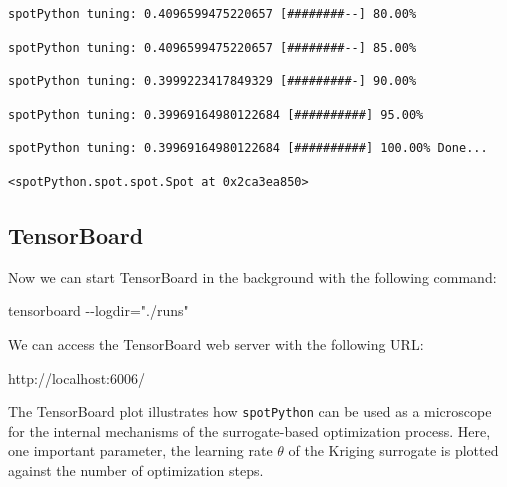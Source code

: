 \documentclass[
  letterpaper,
  DIV=11,
  numbers=noendperiod]{scrreprt}
\newenvironment{Shaded}{\begin{snugshade}}{\end{snugshade}}
\newcommand{\NormalTok}[1]{\textcolor[rgb]{0.00,0.23,0.31}{#1}}
\begin{document}
\begin{verbatim}
spotPython tuning: 0.4096599475220657 [########--] 80.00% 
\end{verbatim}

\begin{verbatim}
spotPython tuning: 0.4096599475220657 [########--] 85.00% 
\end{verbatim}

\begin{verbatim}
spotPython tuning: 0.3999223417849329 [#########-] 90.00% 
\end{verbatim}

\begin{verbatim}
spotPython tuning: 0.39969164980122684 [##########] 95.00% 
\end{verbatim}

\begin{verbatim}
spotPython tuning: 0.39969164980122684 [##########] 100.00% Done...
\end{verbatim}

\begin{verbatim}
<spotPython.spot.spot.Spot at 0x2ca3ea850>
\end{verbatim}

\hypertarget{tensorboard-1}{%
\subsection{TensorBoard}\label{tensorboard-1}}

Now we can start TensorBoard in the background with the following
command:

\begin{Shaded}
\begin{Highlighting}[]
\NormalTok{tensorboard {-}{-}logdir="./runs"}
\end{Highlighting}
\end{Shaded}

We can access the TensorBoard web server with the following URL:

\begin{Shaded}
\begin{Highlighting}[]
\NormalTok{http://localhost:6006/}
\end{Highlighting}
\end{Shaded}

The TensorBoard plot illustrates how \texttt{spotPython} can be used as
a microscope for the internal mechanisms of the surrogate-based
optimization process. Here, one important parameter, the learning rate
\(\theta\) of the Kriging surrogate is plotted against the number of
optimization steps.
\end{document}
